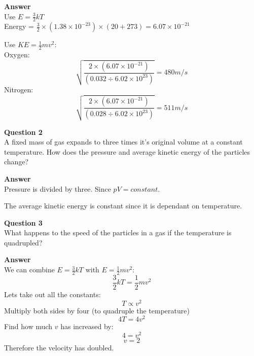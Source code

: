 \documentclass{article}
\begin{document}
\textbf{Answer}\\
Use $E = \frac{3}{2}kT$\\
Energy = $\frac{3}{2} \times (1.38 \times 10^{-23}) \times (20+273) = 6.07
\times 10^{-21}$

Use $KE = \frac{1}{2}mv^2$:\\
Oxygen: 
\[
	\sqrt{
		\frac{
			2 \times (6.07 \times 10^{-21})
		}{
			(0.032 \div 6.02\times 10^{23})
		}
	} = 480m/s
\]
Nitrogen: 
\[
	\sqrt{
		\frac{
			2 \times (6.07 \times 10^{-21})
		}{
			(0.028 \div 6.02\times 10^{23})
		}
	} = 511m/s
\]

\textbf{Question 2}\\
A fixed mass of gas expands to three times it's original volume at a constant
temperature. How does the pressure and average kinetic energy of the particles
change?

\textbf{Answer}\\
Pressure is divided by three. Since $pV = constant$.

The average kinetic energy is constant since it is dependant on temperature.

\textbf{Question 3}\\
What happens to the speed of the particles in a gas if the temperature is
quadrupled?

\textbf{Answer}\\
We can combine $E = \frac{3}{2}kT$ with $E = \frac{1}{2}mv^2$:
\[
	\frac{3}{2}kT = \frac{1}{2}mv^2
\]
Lets take out all the constants:
\[
	T \propto v^2
\]
Multiply both sides by four (to quadruple the temperature)
\[
	4T = 4v^2
\]
Find how much $v$ has increased by:
\[
	4 = v^2
\]
\[
		v = 2
\]
Therefore the velocity has doubled.
\end{document}
